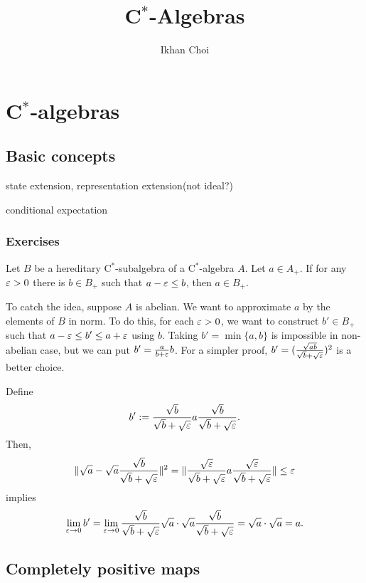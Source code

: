 \documentclass{../../large}
\begin{document}
\title{C$^*$-Algebras}
\author{Ikhan Choi}
\maketitle
\tableofcontents

\part{C$^*$-algebras}
\chapter{Basic concepts}



\begin{prb}
state extension, representation extension(not ideal?)
\end{prb}

conditional expectation


\section*{Exercises}
\begin{prb}
Let $B$ be a hereditary C$^*$-subalgebra of a C$^*$-algebra $A$.
Let $a\in A_+$.
If for any $\varepsilon>0$ there is $b\in B_+$ such that $a-\varepsilon\le b$, then $a\in B_+$.
\end{prb}
\begin{pf}
To catch the idea, suppose $A$ is abelian.
We want to approximate $a$ by the elements of $B$ in norm.
To do this, for each $\varepsilon>0$, we want to construct $b'\in B_+$ such that $a-\varepsilon\le b'\le a+\varepsilon$ using $b$.
Taking $b'=\min\{a,b\}$ is impossible in non-abelian case, but we can put $b'=\frac a{b+\varepsilon}b$.
For a simpler proof, $b'=(\frac{\sqrt{ab}}{\sqrt b+\sqrt{\varepsilon}})^2$ is a better choice.

Define
\[b':=\frac{\sqrt b}{\sqrt b+\sqrt{\varepsilon}}a\frac{\sqrt b}{\sqrt b+\sqrt{\varepsilon}}.\]
Then,
\[\|\sqrt a-\sqrt a\frac{\sqrt b}{\sqrt b+\sqrt{\varepsilon}}\|^2=\|\frac{\sqrt{\varepsilon}}{\sqrt b+\sqrt{\varepsilon}}a\frac{\sqrt{\varepsilon}}{\sqrt b+\sqrt{\varepsilon}}\|\le\varepsilon\]
implies
\[\lim_{\varepsilon\to0}b'=\lim_{\varepsilon\to0}\frac{\sqrt b}{\sqrt b+\sqrt{\varepsilon}}\sqrt a\cdot\sqrt a\frac{\sqrt b}{\sqrt b+\sqrt{\varepsilon}}=\sqrt a\cdot\sqrt a=a.\]
\end{pf}





\chapter{Completely positive maps}
\end{document}
